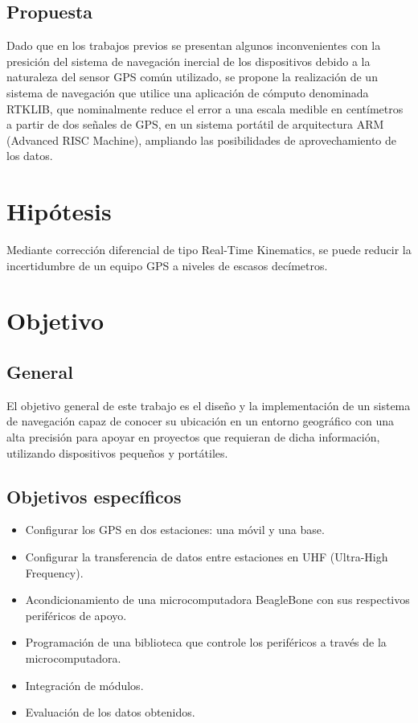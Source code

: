 \subsection{Propuesta}
Dado que en los trabajos previos se presentan algunos inconvenientes con la presición del sistema de navegación inercial de los dispositivos debido a la naturaleza del sensor GPS común utilizado, se propone la realización de un sistema de navegación que utilice una aplicación de cómputo denominada RTKLIB, que nominalmente reduce el error a una escala medible en centímetros a partir de dos señales de GPS, en un sistema portátil de arquitectura ARM (Advanced RISC Machine), ampliando las posibilidades de aprovechamiento de los datos.

\section{Hipótesis}
Mediante corrección diferencial de tipo Real-Time Kinematics, se puede reducir la incertidumbre de un equipo GPS a niveles de escasos decímetros.

\section{Objetivo}
\subsection{General}
El objetivo general de este trabajo es el diseño y la implementación de un sistema de navegación capaz de conocer su ubicación en un entorno geográfico con una alta precisión para apoyar en proyectos que requieran de dicha información, utilizando dispositivos pequeños y portátiles.

\subsection{Objetivos específicos}
\begin{itemize}
	\item Configurar los GPS en dos estaciones: una móvil y una base.
    \item Configurar la transferencia de datos entre estaciones en UHF (Ultra-High Frequency\footnotemark).
    \item Acondicionamiento de una microcomputadora BeagleBone con sus respectivos periféricos de apoyo.
    \item Programación de una biblioteca que controle los periféricos a través de la microcomputadora.
    \item Integración de módulos.
	\item Evaluación de los datos obtenidos.   
\end{itemize}

